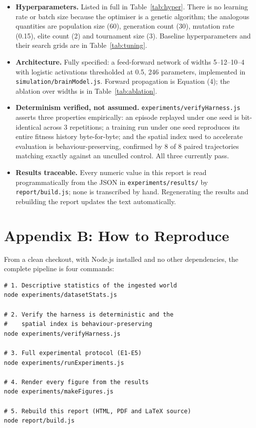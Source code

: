 \documentclass[conference]{IEEEtran}
\begin{document}
\begin{itemize}
\item[$\boxtimes$] \textbf{Hyperparameters.} Listed in full in Table~\ref{tab:hyper}. There is no learning rate or batch size because the optimiser is a genetic algorithm; the analogous quantities are population size (60), generation count (30), mutation rate (0.15), elite count (2) and tournament size (3). Baseline hyperparameters and their search grids are in Table~\ref{tab:tuning}.
\item[$\boxtimes$] \textbf{Architecture.} Fully specified: a feed-forward network of widths 5–12–10–4 with logistic activations thresholded at 0.5, 246 parameters, implemented in \texttt{simulation/brainModel.js}. Forward propagation is Equation (4); the ablation over widths is in Table~\ref{tab:ablation}.
\item[$\boxtimes$] \textbf{Determinism verified, not assumed.} \texttt{experiments/verifyHarness.js} asserts three properties empirically: an episode replayed under one seed is bit-identical across 3 repetitions; a training run under one seed reproduces its entire fitness history byte-for-byte; and the spatial index used to accelerate evaluation is behaviour-preserving, confirmed by 8 of 8 paired trajectories matching exactly against an unculled control. All three currently pass.
\item[$\boxtimes$] \textbf{Results traceable.} Every numeric value in this report is read programmatically from the JSON in \texttt{experiments/results/} by \texttt{report/build.js}; none is transcribed by hand. Regenerating the results and rebuilding the report updates the text automatically.
\end{itemize}

\section*{Appendix B: How to Reproduce}

\label{sec:appB}

From a clean checkout, with Node.js installed and no other dependencies, the complete pipeline is four commands:

\begin{verbatim}
# 1. Descriptive statistics of the ingested world
node experiments/datasetStats.js

# 2. Verify the harness is deterministic and the
#    spatial index is behaviour-preserving
node experiments/verifyHarness.js

# 3. Full experimental protocol (E1-E5)
node experiments/runExperiments.js

# 4. Render every figure from the results
node experiments/makeFigures.js

# 5. Rebuild this report (HTML, PDF and LaTeX source)
node report/build.js
\end{verbatim}
\end{document}
